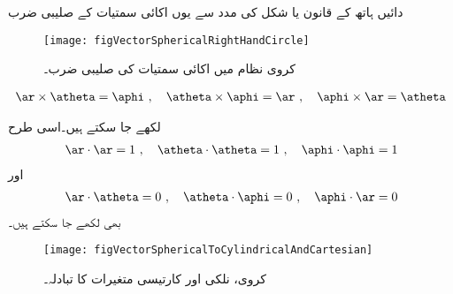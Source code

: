 دائیں ہاتھ کے قانون  یا شکل  کی مدد سے یوں اکائی سمتیات کے صلیبی ضرب
\begin{figure}
\centering
\texttt{[image: figVectorSphericalRightHandCircle]}
\caption{کروی نظام میں اکائی سمتیات کی صلیبی ضرب۔}
\label{شکل_سمتیہ_کروی_صلیبی_ضرب_اکائی_سمتیات}
\end{figure}

\begin{align}
\ar \times \atheta=\aphi \,\, , \quad \atheta \times \aphi=\ar \, \, , \quad \aphi \times \ar =\atheta
\end{align}

لکھے جا سکتے ہیں۔اسی طرح
\begin{align}
\ar \cdot \ar=1 \,\, , \quad \atheta \cdot \atheta=1 \,\, , \quad \aphi \cdot \aphi=1
\end{align}
اور
\begin{align}
\ar \cdot \atheta=0 \,\, , \quad \atheta \cdot \aphi=0 \,\, , \quad \aphi \cdot \ar=0
\end{align}
بھی لکھے جا سکتے ہیں۔

\begin{figure}
\centering
\texttt{[image: figVectorSphericalToCylindricalAndCartesian]}
\caption{کروی، نلکی اور کارتیسی متغیرات کا تبادلہ۔}
\label{شکل_سمتیہ_کروی_نلکی_متغیرات_تبادلہ}
\end{figure}

